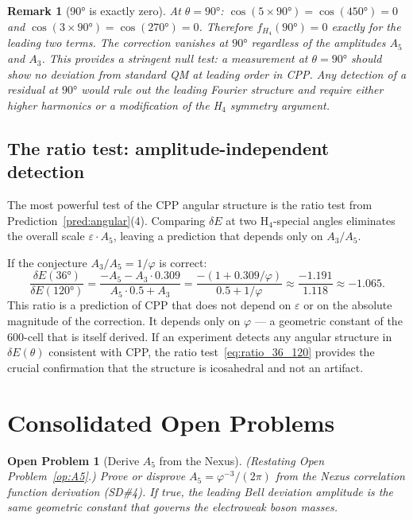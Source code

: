\documentclass[11pt,letterpaper]{article}
\newtheorem{remark}[theorem]{Remark}
\newtheorem{openprob}[theorem]{Open Problem}
\newcommand{\phig}{\varphi}
\newcommand{\eps}{\varepsilon}
\begin{document}
\begin{remark}[90° is exactly zero]
At $\theta = 90°$: $\cos(5\times90°) = \cos(450°) = 0$ and
$\cos(3\times90°) = \cos(270°) = 0$.  Therefore $f_{H_4}(90°) = 0$
\emph{exactly} for the leading two terms.  The correction vanishes at
$90°$ regardless of the amplitudes $A_5$ and $A_3$.  This provides
a stringent null test: a measurement at $\theta = 90°$ should show
\emph{no deviation} from standard QM at leading order in CPP.  Any
detection of a residual at $90°$ would rule out the leading Fourier
structure and require either higher harmonics or a modification of
the H$_4$ symmetry argument.
\end{remark}

\subsection{The ratio test: amplitude-independent detection}

The most powerful test of the CPP angular structure is the ratio test
from Prediction~\ref{pred:angular}(4).  Comparing $\delta E$ at two
H$_4$-special angles eliminates the overall scale $\eps \cdot A_5$,
leaving a prediction that depends only on $A_3/A_5$.

If the conjecture $A_3/A_5 = 1/\phig$ is correct:
\begin{equation}
\frac{\delta E(36°)}{\delta E(120°)}
= \frac{-A_5 - A_3\cdot0.309}{A_5\cdot0.5 + A_3}
= \frac{-(1 + 0.309/\phig)}{0.5 + 1/\phig}
\approx \frac{-1.191}{1.118} \approx -1.065.
\label{eq:ratio_36_120}
\end{equation}
This ratio is a prediction of CPP that does not depend on $\eps$ or
on the absolute magnitude of the correction.  It depends only on
$\phig$ --- a geometric constant of the 600-cell that is itself
derived.  If an experiment detects any angular structure in $\delta
E(\theta)$ consistent with CPP, the ratio test~\eqref{eq:ratio_36_120}
provides the crucial confirmation that the structure is icosahedral
and not an artifact.

\section{Consolidated Open Problems}

\begin{openprob}[Derive $A_5$ from the Nexus]
(Restating Open Problem~\ref{op:A5}.)
Prove or disprove $A_5 = \phig^{-3}/(2\pi)$ from the Nexus
correlation function derivation (SD\#4).  If true, the leading Bell
deviation amplitude is the same geometric constant that governs the
electroweak boson masses.
\end{openprob}
\end{document}
